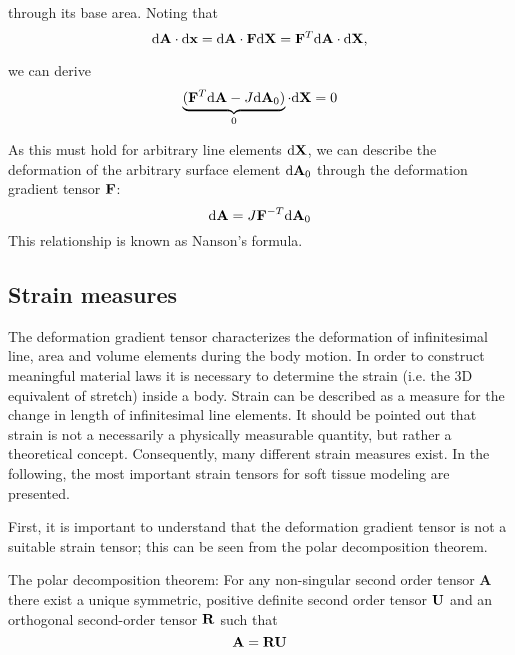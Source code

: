 through its base area. Noting that
 \begin{equation}
  \textnormal{d}\mathbf{A} \cdot \textnormal{d} \mathbf {x } =  \textnormal{d}\mathbf{A} \cdot \mathbf {F } \textnormal{d} \mathbf {X } = \mathbf {F } ^T  \textnormal{d}\mathbf{A} \cdot \textnormal{d} \mathbf {X },
\end{equation}

we can derive 
 \begin{equation}
\underbrace{(\mathbf {F } ^T  \textnormal{d}\mathbf{A} - J   \textnormal{d}\mathbf{A}_0) }_{0} \cdot \textnormal{d} \mathbf {X }= 0
\end{equation}

As this must hold for arbitrary line elements $\textnormal{d} \mathbf {X }$, we can describe the deformation of the arbitrary surface element $ \textnormal{d}\mathbf{A}_0$ through the deformation gradient tensor $\mathbf {F }$:
 \begin{equation}
 \textnormal{d}\mathbf{A} = J \mathbf {F }^{-T}  \textnormal{d}\mathbf{A}_0
\label{NansonsFormula}
\end{equation}
This relationship is known as Nanson's formula.

\subsection{Strain measures}
\label{SectionPolarDecomposition}

The deformation gradient tensor characterizes the deformation of infinitesimal line, area and volume elements during the body motion. In order to construct meaningful material laws it is necessary to determine the strain (i.e. the 3D equivalent of stretch) inside a body. Strain can be described as a measure for the change in length of infinitesimal line elements. It should be pointed out that strain is not a necessarily a physically measurable quantity, but rather a theoretical concept. Consequently, many different strain measures exist. In the following, the most important strain tensors for soft tissue modeling are presented.

First, it is important to understand that the deformation gradient tensor is not a suitable strain tensor; this can be seen from the polar decomposition theorem.

\begin{theorem}
The polar decomposition theorem: For any non-singular second order tensor $\mathbf A$ there exist a unique symmetric, positive definite second order tensor $\mathbf {U} $ and an orthogonal second-order tensor $\mathbf{R}$ such that
\begin{equation}
\mathbf A = \mathbf{R} \mathbf {U} 
\end{equation}
\label{PolarDecompTheorem}
\end{theorem}

